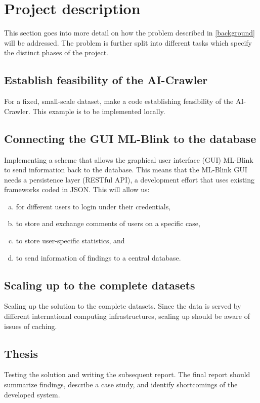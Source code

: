 \section{Project description} \label{description}

This section goes into more detail on how the problem described in \ref{background} will be addressed. The problem is further split into different tasks which specify the distinct phases of the project. 

\subsection{Establish feasibility of the AI-Crawler}

For a fixed, small-scale dataset, make a code establishing feasibility of the AI-Crawler. This example is to be implemented locally.

\subsection{Connecting the GUI ML-Blink to the database}

Implementing a scheme that allows the graphical user interface (GUI) ML-Blink to send information back to the database. This means that the ML-Blink GUI needs a persistence layer (RESTful API), a development effort that uses existing frameworks coded in JSON.  This will allow us:

\begin{enumerate}[(a)]
  \item for different users to login under their credentials,
  \item to store and exchange comments of users on a specific case,
  \item to store user-specific statistics, and
  \item to send information of findings to a central database.
\end{enumerate}

\subsection{Scaling up to the complete datasets}

Scaling up the solution to the complete datasets. Since the data is served by different international computing infrastructures, scaling up should be aware of issues of caching. 
 
\subsection{Thesis}

Testing the solution and writing the subsequent report. The final report should summarize findings, describe a case study, and identify shortcomings of the developed system.